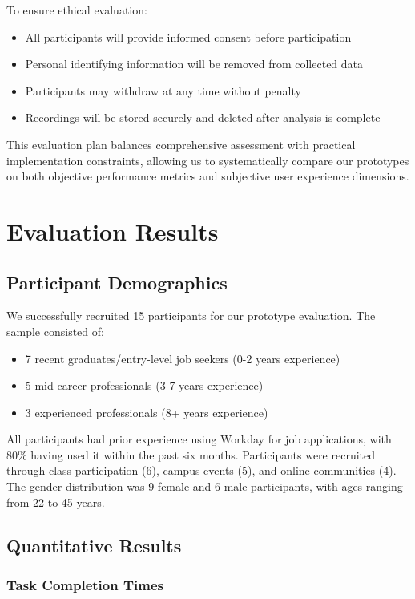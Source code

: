 \documentclass[
	letterpaper, %
]{jdf}
\begin{document}
\begin{sloppypar}
To ensure ethical evaluation:
\begin{itemize}
    \item All participants will provide informed consent before participation
    \item Personal identifying information will be removed from collected data
    \item Participants may withdraw at any time without penalty
    \item Recordings will be stored securely and deleted after analysis is complete
\end{itemize}

This evaluation plan balances comprehensive assessment with practical implementation constraints, allowing us to systematically compare our prototypes on both objective performance metrics and subjective user experience dimensions.

\newpage
\section{Evaluation Results}

\subsection{Participant Demographics}

We successfully recruited 15 participants for our prototype evaluation. The sample consisted of:
\begin{itemize}
    \item 7 recent graduates/entry-level job seekers (0-2 years experience)
    \item 5 mid-career professionals (3-7 years experience)
    \item 3 experienced professionals (8+ years experience)
\end{itemize}

All participants had prior experience using Workday for job applications, with 80\% having used it within the past six months. Participants were recruited through class participation (6), campus events (5), and online communities (4). The gender distribution was 9 female and 6 male participants, with ages ranging from 22 to 45 years.

\subsection{Quantitative Results}

\subsubsection{Task Completion Times}


\end{sloppypar}
\end{document}
